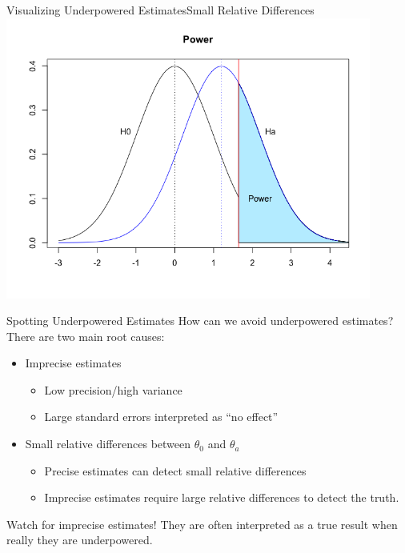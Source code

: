 \documentclass{beamer}
\begin{document}
\begin{frame}{Visualizing Underpowered Estimates}{Small Relative Differences}
	\includegraphics[width=0.9\textwidth]{underpoweredsmalldiff.png}
\end{frame}

\begin{frame}{Spotting Underpowered Estimates}
	How can we avoid underpowered estimates? There are two main root causes:

	\begin{itemize}
		\item Imprecise estimates
			\begin{itemize}
		      	\item Low precision/high variance
		      	\item Large standard errors interpreted as ``no effect''
			\end{itemize}
		\item Small relative differences between $\theta_0$ and $\theta_a$
			\begin{itemize}
		      	\item Precise estimates can detect small relative differences
		      	\item Imprecise estimates require large relative differences to detect the truth. 
			\end{itemize}
	\end{itemize}
			 
	Watch for imprecise estimates! They are often interpreted as a true result when really they are underpowered. %
\end{frame}
\end{document}
